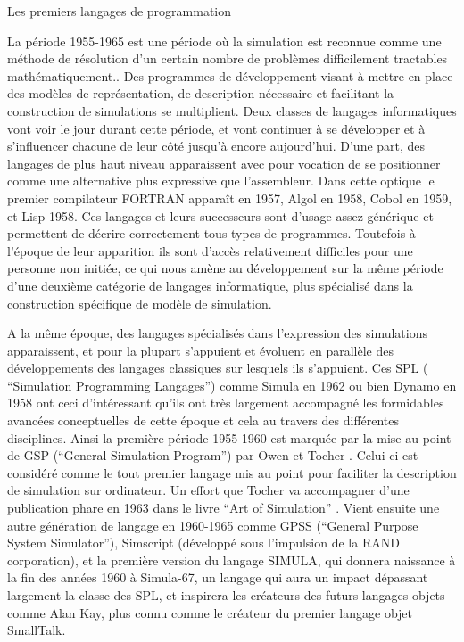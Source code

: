 \pagebreak

\begin{testiv}{Les premiers langages de programmation}{}

La période 1955-1965 est une période où la simulation est reconnue comme une méthode de résolution d'un certain nombre de problèmes difficilement tractables mathématiquement.\autocite{Nance1993, Ackoff1961}. Des programmes de développement visant à mettre en place des modèles de représentation, de description nécessaire et facilitant la construction de simulations se multiplient. Deux classes de langages informatiques vont voir le jour durant cette période, et vont continuer à se développer et à s'influencer chacune de leur côté jusqu'à encore aujourd'hui. D'une part, des langages de plus haut niveau apparaissent avec pour vocation de se positionner comme une alternative plus expressive que l'assembleur. Dans cette optique le premier compilateur FORTRAN apparaît en 1957,  Algol en 1958, Cobol en 1959, et Lisp 1958. Ces langages et leurs successeurs sont d'usage assez générique et permettent de décrire correctement tous types de programmes. Toutefois à l'époque de leur apparition ils sont d'accès relativement difficiles pour une personne non initiée, ce qui nous amène au développement sur la même période d'une deuxième catégorie de langages informatique, plus spécialisé dans la construction spécifique de modèle de simulation. \autocite[239]{Naylor1966}

A la même époque, des langages spécialisés dans l'expression des simulations apparaissent, et pour la plupart s'appuient et évoluent en parallèle des développements des langages classiques sur lesquels ils s'appuient. Ces SPL ( \foreignquote{english}{Simulation Programming Langages}) comme Simula en 1962 ou bien Dynamo en 1958 ont ceci d'intéressant qu'ils ont très largement accompagné les formidables avancées conceptuelles de cette époque et cela au travers des différentes disciplines. Ainsi la première période 1955-1960 est marquée par la mise au point de GSP (\foreignquote{english}{General Simulation Program}) par Owen et Tocher \autocite{Tocher1960}. Celui-ci est considéré comme le tout premier langage mis au point pour faciliter la description de simulation sur ordinateur. Un effort que Tocher va accompagner d'une publication phare en 1963 dans le livre \foreignquote{english}{Art of Simulation} \autocite{Tocher1963} . Vient ensuite une autre génération de langage en 1960-1965 comme GPSS (\foreignquote{english}{General Purpose System Simulator}), Simscript (développé sous l'impulsion de la RAND corporation), et la première version du langage SIMULA, qui donnera naissance à la fin des années 1960 à Simula-67, un langage qui aura un impact dépassant largement la classe des SPL, et inspirera les créateurs des futurs langages objets comme Alan Kay, plus connu comme le créateur du premier langage objet SmallTalk. 


\end{testiv}
